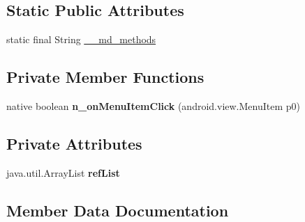 \subsection*{Static Public Attributes}
\begin{DoxyCompactItemize}
\item 
static final String \hyperlink{classmono_1_1android_1_1support_1_1v7_1_1widget_1_1Toolbar__OnMenuItemClickListenerImplementor_ae2a6ab2c5121d74c0a12e594c68ddb43}{\+\_\+\+\_\+md\+\_\+methods}
\end{DoxyCompactItemize}
\subsection*{Private Member Functions}
\begin{DoxyCompactItemize}
\item 
\mbox{\label{classmono_1_1android_1_1support_1_1v7_1_1widget_1_1Toolbar__OnMenuItemClickListenerImplementor_a124d4be0ec8f25b133340955b303586b}} 
native boolean {\bfseries n\+\_\+on\+Menu\+Item\+Click} (android.\+view.\+Menu\+Item p0)
\end{DoxyCompactItemize}
\subsection*{Private Attributes}
\begin{DoxyCompactItemize}
\item 
\mbox{\label{classmono_1_1android_1_1support_1_1v7_1_1widget_1_1Toolbar__OnMenuItemClickListenerImplementor_a2f60f8fbcf6b47b4136cb41c8b5d31bf}} 
java.\+util.\+Array\+List {\bfseries ref\+List}
\end{DoxyCompactItemize}


\subsection{Member Data Documentation}
\mbox{\label{classmono_1_1android_1_1support_1_1v7_1_1widget_1_1Toolbar__OnMenuItemClickListenerImplementor_ae2a6ab2c5121d74c0a12e594c68ddb43}} 
